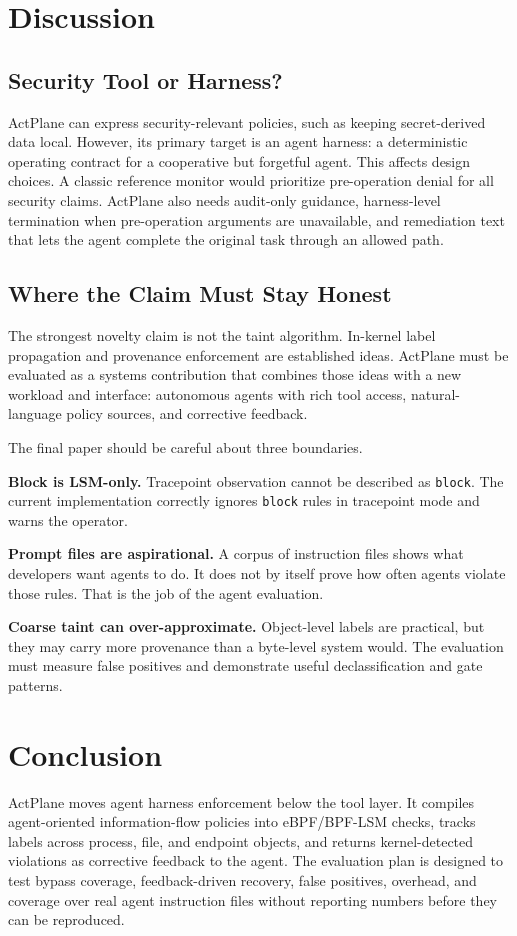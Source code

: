\section{Discussion}

\subsection{Security Tool or Harness?}

ActPlane can express security-relevant policies, such as keeping secret-derived
data local. However, its primary target is an agent harness: a deterministic
operating contract for a cooperative but forgetful agent. This affects design
choices. A classic reference monitor would prioritize pre-operation denial for
all security claims. ActPlane also needs audit-only guidance, harness-level
termination when pre-operation arguments are unavailable, and remediation text
that lets the agent complete the original task through an allowed path.

\subsection{Where the Claim Must Stay Honest}

The strongest novelty claim is not the taint algorithm. In-kernel label
propagation and provenance enforcement are established ideas. ActPlane must be
evaluated as a systems contribution that combines those ideas with a new
workload and interface: autonomous agents with rich tool access, natural-language
policy sources, and corrective feedback.

The final paper should be careful about three boundaries.

\textbf{Block is LSM-only.} Tracepoint observation cannot be described as
\texttt{block}. The current implementation correctly ignores \texttt{block}
rules in tracepoint mode and warns the operator.

\textbf{Prompt files are aspirational.} A corpus of instruction files shows what
developers want agents to do. It does not by itself prove how often agents
violate those rules. That is the job of the agent evaluation.

\textbf{Coarse taint can over-approximate.} Object-level labels are practical,
but they may carry more provenance than a byte-level system would. The evaluation
must measure false positives and demonstrate useful declassification and gate
patterns.

\section{Conclusion}

ActPlane moves agent harness enforcement below the tool layer. It compiles
agent-oriented information-flow policies into eBPF/BPF-LSM checks, tracks labels
across process, file, and endpoint objects, and returns kernel-detected
violations as corrective feedback to the agent. The evaluation plan is designed
to test bypass coverage, feedback-driven recovery, false positives, overhead,
and coverage over real agent instruction files without reporting numbers before
they can be reproduced.
